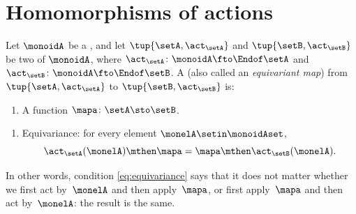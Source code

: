 
\section{Homomorphisms of actions}


\begin{ctdefinition}
    \label{def:monoid-action-morphism}
    Let $\monoidA$ be a , and let $\tup{\setA, \act_\setA}$ and $\tup{\setB, \act_\setB}$ be two  of $\monoidA$, where $\act_\setA \colon \monoidA \fto \Endof\setA$ and $\act_\setB \colon \monoidA \fto \Endof\setB$.
    A  (also called an \emph{equivariant map}) from $\tup{\setA, \act_\setA}$ to $\tup{\setB, \act_\setB}$ is:

    \constit
    \begin{enumerate}
        \item A function $\mapa \colon \setA \sto \setB$.
    \end{enumerate}

    \condit
    \begin{enumerate}
        \item Equivariance: for every element $\monelA \setin \monoidAset$,
              \begin{equation}
                  \label{eq:equivariance}
                  \act_\setA(\monelA) \mthen \mapa = \mapa \mthen \act_\setB(\monelA).
              \end{equation}
    \end{enumerate}
\end{ctdefinition}

In other words, condition \cref{eq:equivariance} says that it does not matter whether we first act by~$\monelA$ and then apply~$\mapa$, or first apply~$\mapa$ and then act by~$\monelA$: the result is the same.

